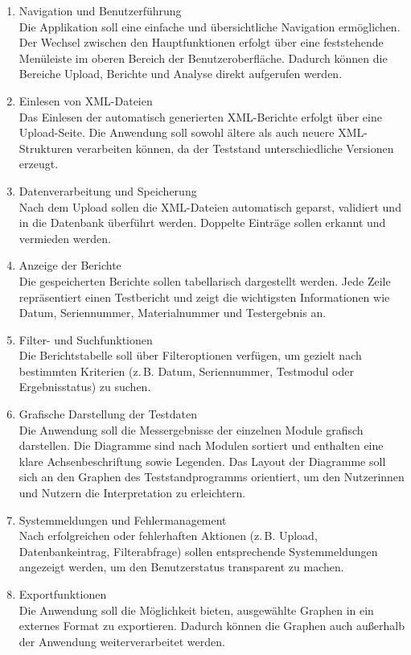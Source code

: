 \begin{enumerate}
  \item Navigation und Benutzerführung \\
  Die Applikation soll eine einfache und übersichtliche Navigation ermöglichen.
  Der Wechsel zwischen den Hauptfunktionen erfolgt über eine feststehende Menüleiste im oberen Bereich der Benutzeroberfläche.
  Dadurch können die Bereiche Upload, Berichte und Analyse direkt aufgerufen werden.

  \item Einlesen von XML-Dateien \\
  Das Einlesen der automatisch generierten XML-Berichte erfolgt über eine Upload-Seite.
  Die Anwendung soll sowohl ältere als auch neuere XML-Strukturen verarbeiten können, da der Teststand unterschiedliche Versionen erzeugt.

  \item Datenverarbeitung und Speicherung \\
  Nach dem Upload sollen die XML-Dateien automatisch geparst, validiert und in die Datenbank überführt werden.
  Doppelte Einträge sollen erkannt und vermieden werden.

  \item Anzeige der Berichte \\
  Die gespeicherten Berichte sollen tabellarisch dargestellt werden.
  Jede Zeile repräsentiert einen Testbericht und zeigt die wichtigsten Informationen wie Datum, Seriennummer, Materialnummer und Testergebnis an.

  \item Filter- und Suchfunktionen \\
  Die Berichtstabelle soll über Filteroptionen verfügen, um gezielt nach bestimmten Kriterien
  (z.\,B. Datum, Seriennummer, Testmodul oder Ergebnisstatus) zu suchen.

  \item Grafische Darstellung der Testdaten \\
  Die Anwendung soll die Messergebnisse der einzelnen Module grafisch darstellen.
  Die Diagramme sind nach Modulen sortiert und enthalten eine klare Achsenbeschriftung sowie Legenden.
  Das Layout der Diagramme soll sich an den Graphen des Teststandprogramms orientiert, um den Nutzerinnen und Nutzern die Interpretation zu erleichtern.

  \item Systemmeldungen und Fehlermanagement \\
  Nach erfolgreichen oder fehlerhaften Aktionen (z.\,B. Upload, Datenbankeintrag, Filterabfrage) sollen entsprechende Systemmeldungen angezeigt werden, um den Benutzerstatus transparent zu machen.

  \item Exportfunktionen \\
  Die Anwendung soll die Möglichkeit bieten, ausgewählte Graphen in ein externes Format zu exportieren.
  Dadurch können die Graphen auch außerhalb der Anwendung weiterverarbeitet werden.
\end{enumerate}

